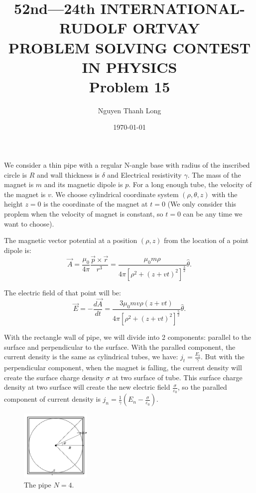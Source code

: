 \documentclass[12pt]{article}
\title{52nd—24th INTERNATIONAL-RUDOLF ORTVAY \\ PROBLEM SOLVING CONTEST IN PHYSICS \\ Problem 15}
\author{Nguyen Thanh Long}
\date{\today}
\begin{document}
	
\maketitle
	
\noindent We consider a thin pipe with a regular N-angle base with radius of the inscribed circle is $R$ and wall thickness is $\delta$ and Electrical resistivity $\gamma$. The mass of the magnet is $m$ and its magnetic dipole is $p$. For a long enough tube, the velocity of the magnet is $v$. We choose cylindrical coordinate system $(\rho,\theta,z)$ with the height $z=0$ is the coordinate of the magnet at $t=0$ (We only consider this proplem when the velocity of magnet is constant, so $t=0$ can be any time we want to choose). 
	
\noindent The magnetic vector potential at a position $(\rho,z)$ from the location of a point dipole is:
$$ \vec{A} = \frac{\mu_0}{4 \pi} \frac{ \vec{p} \times \vec{r} }{r^3} = \frac{\mu_0 m \rho}{4 \pi \left[ \rho^2 + \left(z+vt \right)^2 \right]^{\frac{3}{2}}} \hat{\theta}.$$ 

\noindent The electric field of that point will be:
$$ \vec{E} = - \frac{ d \vec{A} }{dt} = \frac{3 \mu_0 m v \rho \left( z + vt \right)}{4 \pi \left[ \rho^2 + \left(z+vt \right)^2 \right]^{\frac{5}{2}}} \hat{\theta} .$$

\noindent With the rectangle wall of pipe, we will divide into 2 components: parallel to the surface and perpendicular to the surface. With the paralled component, the current density is the same as cylindrical tubes, we have: $j_t = \frac{E_t}{\gamma}$. But with the perpendicular component, when the magnet is falling, the current density will create the surface charge density $\sigma$ at two surface of tube. This surface charge density at two surface will create the new electric field $\frac{\sigma}{\varepsilon_0}$, so the paralled component of current density is $j_n = \frac{1}{\gamma} \left( E_n - \frac{\sigma}{\varepsilon_0} \right)$.

\begin{figure}[!htb]
	\centering
	\includegraphics[width=0.3\textwidth]{Fig P15.png}
	\caption{ The pipe $N = 4$.}
	\label{fig1}
\end{figure}	
\end{document}
